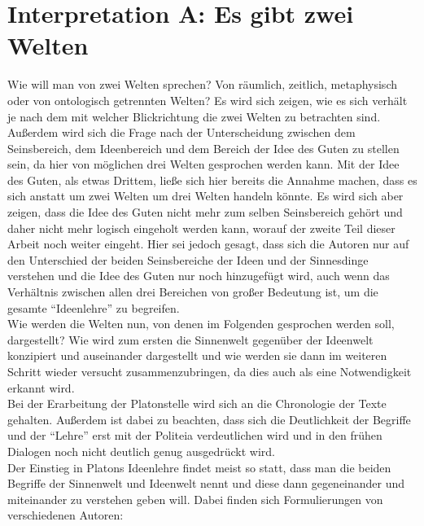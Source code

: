 \section{Interpretation A: Es gibt zwei Welten}
Wie will man von zwei Welten sprechen? Von räumlich, zeitlich, metaphysisch oder von ontologisch getrennten Welten? Es wird sich zeigen, wie es sich verhält je nach dem mit welcher Blickrichtung die zwei Welten zu betrachten sind. Außerdem wird sich die Frage nach der Unterscheidung zwischen dem Seinsbereich, dem Ideenbereich und dem Bereich der Idee des Guten zu stellen sein, da hier von möglichen drei Welten gesprochen werden kann. Mit der Idee des Guten, als etwas Drittem, ließe sich hier bereits die Annahme machen, dass es sich anstatt um zwei Welten um drei Welten handeln könnte. Es wird sich aber zeigen, dass die Idee des Guten nicht mehr zum selben Seinsbereich gehört und daher nicht mehr logisch eingeholt werden kann, worauf der zweite Teil dieser Arbeit noch weiter eingeht. Hier sei jedoch gesagt, dass sich die Autoren nur auf den Unterschied der beiden Seinsbereiche der Ideen und der Sinnesdinge verstehen und die Idee des Guten nur noch hinzugefügt wird, auch wenn das Verhältnis zwischen allen drei Bereichen von großer Bedeutung ist, um die gesamte \enquote{Ideenlehre} zu begreifen.\\
Wie werden die Welten nun, von denen im Folgenden gesprochen werden soll, dargestellt? Wie wird zum ersten die Sinnenwelt gegenüber der Ideenwelt konzipiert und auseinander dargestellt und wie werden sie dann im weiteren Schritt wieder versucht zusammenzubringen, da dies auch als eine Notwendigkeit erkannt wird.\\
Bei der Erarbeitung der Platonstelle wird sich an die Chronologie der Texte gehalten. Außerdem ist dabei zu beachten, dass sich die Deutlichkeit der Begriffe und der \enquote{Lehre} erst mit der Politeia verdeutlichen wird und in den frühen Dialogen noch nicht deutlich genug ausgedrückt wird.\\
Der Einstieg in Platons Ideenlehre findet meist so statt, dass man die beiden Begriffe der Sinnenwelt und Ideenwelt nennt und diese dann gegeneinander und miteinander zu verstehen geben will. Dabei finden sich Formulierungen von verschiedenen Autoren: 
